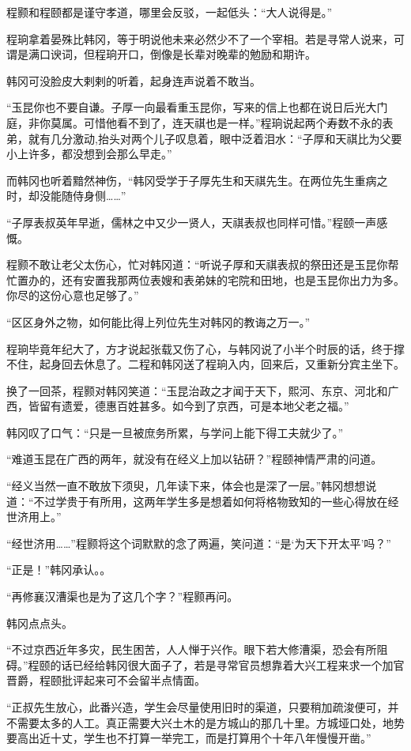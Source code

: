 程颢和程颐都是谨守孝道，哪里会反驳，一起低头：“大人说得是。”

程珦拿着晏殊比韩冈，等于明说他未来必然少不了一个宰相。若是寻常人说来，可谓是满口谀词，但程珦开口，倒像是长辈对晚辈的勉励和期许。

韩冈可没脸皮大剌剌的听着，起身连声说着不敢当。

“玉昆你也不要自谦。子厚一向最看重玉昆你，写来的信上也都在说日后光大门庭，非你莫属。可惜他看不到了，连天祺也是一样。”程珦说起两个寿数不永的表弟，就有几分激动,抬头对两个儿子叹息着，眼中泛着泪水：“子厚和天祺比为父要小上许多，都没想到会那么早走。”

而韩冈也听着黯然神伤，“韩冈受学于子厚先生和天祺先生。在两位先生重病之时，却没能随侍身侧……”

“子厚表叔英年早逝，儒林之中又少一贤人，天祺表叔也同样可惜。”程颐一声感慨。

程颢不敢让老父太伤心，忙对韩冈道：“听说子厚和天祺表叔的祭田还是玉昆你帮忙置办的，还有安置我那两位表嫂和表弟妹的宅院和田地，也是玉昆你出力为多。你尽的这份心意也足够了。”

“区区身外之物，如何能比得上列位先生对韩冈的教诲之万一。”

程珦毕竟年纪大了，方才说起张载又伤了心，与韩冈说了小半个时辰的话，终于撑不住，起身回去休息了。二程和韩冈送了程珦入内，回来后，又重新分宾主坐下。

换了一回茶，程颢对韩冈笑道：“玉昆治政之才闻于天下，熙河、东京、河北和广西，皆留有遗爱，德惠百姓甚多。如今到了京西，可是本地父老之福。”

韩冈叹了口气：“只是一旦被庶务所累，与学问上能下得工夫就少了。”

“难道玉昆在广西的两年，就没有在经义上加以钻研？”程颐神情严肃的问道。

“经义当然一直不敢放下须臾，几年读下来，体会也是深了一层。”韩冈想想说道：“不过学贵于有所用，这两年学生多是想着如何将格物致知的一些心得放在经世济用上。”

“经世济用……”程颢将这个词默默的念了两遍，笑问道：“是‘为天下开太平’吗？”

“正是！”韩冈承认。。

“再修襄汉漕渠也是为了这几个字？”程颢再问。

韩冈点点头。

“不过京西近年多灾，民生困苦，人人惮于兴作。眼下若大修漕渠，恐会有所阻碍。”程颐的话已经给韩冈很大面子了，若是寻常官员想靠着大兴工程来求一个加官晋爵，程颐批评起来可不会留半点情面。

“正叔先生放心，此番兴造，学生会尽量使用旧时的渠道，只要稍加疏浚便可，并不需要太多的人工。真正需要大兴土木的是方城山的那几十里。方城垭口处，地势要高出近十丈，学生也不打算一举完工，而是打算用个十年八年慢慢开凿。”

